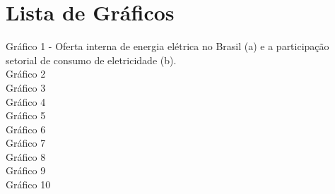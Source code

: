 \section*{Lista de Gráficos}
\vspace*{1.5cm} %
\thispagestyle{empty}
    \begin{onehalfspace}
        Gráfico 1 - Oferta interna de energia elétrica no Brasil (a) e a 
        participação setorial de consumo de eletricidade (b).\\
        Gráfico 2\\
        Gráfico 3\\
        Gráfico 4\\
        Gráfico 5\\
        Gráfico 6\\
        Gráfico 7\\
        Gráfico 8\\
        Gráfico 9\\
        Gráfico 10\\
    \end{onehalfspace}
